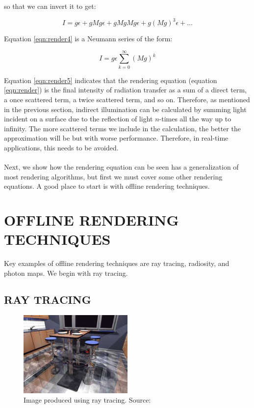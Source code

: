 so that we can invert it to get:

\begin{equation}
I = g\epsilon + gMg\epsilon + gMgMg\epsilon +g(Mg)^3\epsilon + ... \label{eqn:render4}
\end{equation}

Equation \ref{eqn:render4} is a Neumann series of the form:

\begin{equation}
I = g\epsilon\sum_{k=0}^{\infty}(Mg)^k \label{eqn:render5}
\end{equation}

Equation \ref{eqn:render5} indicates that the rendering equation (equation \ref{eqn:render}) is the final intensity of radiation transfer as a sum of a direct term, a once scattered term, a twice scattered term, and so on.  Therefore, as mentioned in the previous section, indirect illumination can be calculated by summing light incident on a surface due to the reflection of light $n$-times all the way up to infinity.  The more scattered terms we include in the calculation, the better the approximation will be but with worse performance.  Therefore, in real-time applications, this needs to be avoided.  

\paragraph{}
Next, we show how the rendering equation can be seen has a generalization of most rendering algorithms, but first we must cover some other rendering equations.  A good place to start is with offline rendering techniques.

\section{OFFLINE RENDERING TECHNIQUES}
\paragraph{}
Key examples of offline rendering techniques are ray tracing, radiosity, and photon maps.  We begin with ray tracing.

\subsection{RAY TRACING}

\begin{figure}[h!]
  \centering
    \includegraphics[width=0.5\textwidth]{raytraceSample.jpg}
  \caption{Image produced using ray tracing. Source: \protect\cite{Wald2003}}
	\label{fig:raytraceSample}
\end{figure}


